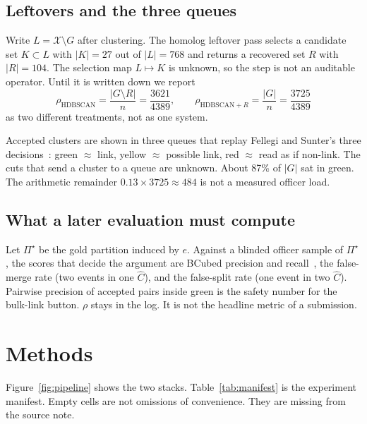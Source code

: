 \documentclass[acmlarge,screen]{acmart}
\begin{document}
\subsection{Leftovers and the three queues}
\label{sec:bands}

Write \(L=\mathcal{X}\setminus G\) after clustering. The homolog leftover pass selects a candidate set \(K\subset L\) with \(\lvert K\rvert=27\) out of \(\lvert L\rvert=768\) and returns a recovered set \(R\) with \(\lvert R\rvert=104\). The selection map \(L\mapsto K\) is unknown, so the step is not an auditable operator. Until it is written down we report
\begin{equation}
  \rho_{\text{HDBSCAN}}=\frac{\lvert G\setminus R\rvert}{n}=\frac{3621}{4389},\qquad
  \rho_{\text{HDBSCAN}+R}=\frac{\lvert G\rvert}{n}=\frac{3725}{4389}
\end{equation}
as two different treatments, not as one system.

Accepted clusters are shown in three queues that replay Fellegi and Sunter's three decisions~\cite{fellegi1969linkage}: green \(\approx\) link, yellow \(\approx\) possible link, red \(\approx\) read as if non-link. The cuts that send a cluster to a queue are unknown. About 87\% of \(\lvert G\rvert\) sat in green. The arithmetic remainder \(0.13\times 3725\approx 484\) is not a measured officer load.

\subsection{What a later evaluation must compute}

Let \(\Pi^\star\) be the gold partition induced by \(e\). Against a blinded officer sample of \(\Pi^\star\), the scores that decide the argument are BCubed precision and recall~\cite{amigo2009bcubed}, the false-merge rate (two events in one \(\widehat{C}\)), and the false-split rate (one event in two \(\widehat{C}\)). Pairwise precision of accepted pairs inside green is the safety number for the bulk-link button. \(\rho\) stays in the log. It is not the headline metric of a submission.

\section{Methods}

Figure~\ref{fig:pipeline} shows the two stacks. Table~\ref{tab:manifest} is the experiment manifest. Empty cells are not omissions of convenience. They are missing from the source note.
\end{document}
